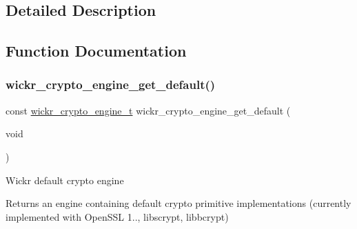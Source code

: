 \subsection{Detailed Description}


\subsection{Function Documentation}
\mbox{\label{group__wickr__crypto__engine_ga4d68232f729ffeda16657582a5267d07}} 
\subsubsection{\texorpdfstring{wickr\_crypto\_engine\_get\_default()}{wickr\_crypto\_engine\_get\_default()}}
{\footnotesize\ttfamily const \mbox{\hyperlink{structwickr__crypto__engine}{wickr\+\_\+crypto\+\_\+engine\+\_\+t}} wickr\+\_\+crypto\+\_\+engine\+\_\+get\+\_\+default (\begin{DoxyParamCaption}\item[{void}]{ }\end{DoxyParamCaption})}

Wickr default crypto engine

\begin{DoxyReturn}{Returns}
an engine containing default crypto primitive implementations (currently implemented with Open\+S\+SL 1.., libscrypt, libbcrypt) 
\end{DoxyReturn}
\mbox{\label{group__wickr__crypto__engine_ga5709d94cd09ef0fb47d1a5f59232f115}} 
